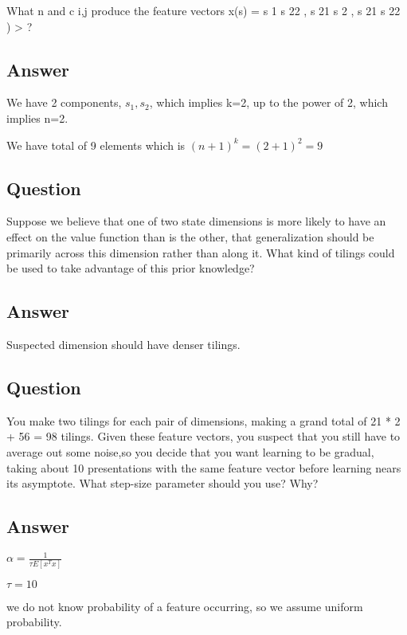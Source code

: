 \documentclass[11pt]{article}
\begin{document}
    What n and c i,j produce the feature vectors x(s) = s 1 s 22 , s 21 s 2 , s 21 s 22 ) > ?

    \subsection*{Answer}

    We have 2 components, $s_1, s_2$, which implies k=2, up to the power of 2, which implies n=2.

    We have total of 9 elements which is $ (n+1)^k = (2+1)^2 = 9 $

    \subsection{Question}

    Suppose we believe that one of two state dimensions is more likely to have an effect on the value function than is the other, that generalization should be primarily across this dimension rather than along it.
    What kind of tilings could be used to take  advantage of this prior knowledge?

    \subsection*{Answer}

    Suspected dimension should have denser tilings.

    \subsection{Question}

    You make  two tilings for each pair of dimensions, making a grand total of 21 * 2 + 56 = 98 tilings.
    Given these feature vectors, you suspect that you still have to average out some noise,so you decide that you want learning to be gradual, taking about 10 presentations with the same feature vector before learning nears its asymptote.
    What step-size parameter should you use?
    Why?

    \subsection*{Answer}

    \noinden  $ \alpha = \frac{1}{\tau E[ x^T x]} $

    \noindent  $ \tau = 10 $

    \noindent  we do not know probability of a feature occurring, so we assume uniform probability.
\end{document}
